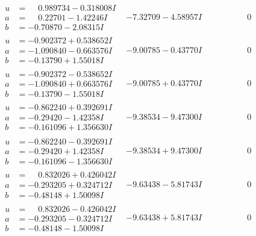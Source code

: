 \documentclass[1p]{elsarticle_modified}
\theoremstyle{definition}
\begin{document}
$$\begin{array}{c|c|c}
\begin{aligned}
u &= \phantom{-}0.989734 - 0.318008 I \\
a &= \phantom{-}0.22701 - 1.42246 I \\
b &= -0.70870 - 2.08315 I\end{aligned}
 & -7.32709 - 4.58957 I & \phantom{-0.000000 } 0 \\ \hline\begin{aligned}
u &= -0.902372 + 0.538652 I \\
a &= -1.090840 - 0.663576 I \\
b &= -0.13790 + 1.55018 I\end{aligned}
 & -9.00785 - 0.43770 I & \phantom{-0.000000 } 0 \\ \hline\begin{aligned}
u &= -0.902372 - 0.538652 I \\
a &= -1.090840 + 0.663576 I \\
b &= -0.13790 - 1.55018 I\end{aligned}
 & -9.00785 + 0.43770 I & \phantom{-0.000000 } 0 \\ \hline\begin{aligned}
u &= -0.862240 + 0.392691 I \\
a &= -0.29420 - 1.42358 I \\
b &= -0.161096 + 1.356630 I\end{aligned}
 & -9.38534 - 9.47300 I & \phantom{-0.000000 } 0 \\ \hline\begin{aligned}
u &= -0.862240 - 0.392691 I \\
a &= -0.29420 + 1.42358 I \\
b &= -0.161096 - 1.356630 I\end{aligned}
 & -9.38534 + 9.47300 I & \phantom{-0.000000 } 0 \\ \hline\begin{aligned}
u &= \phantom{-}0.832026 + 0.426042 I \\
a &= -0.293205 + 0.324712 I \\
b &= -0.48148 + 1.50098 I\end{aligned}
 & -9.63438 - 5.81743 I & \phantom{-0.000000 } 0 \\ \hline\begin{aligned}
u &= \phantom{-}0.832026 - 0.426042 I \\
a &= -0.293205 - 0.324712 I \\
b &= -0.48148 - 1.50098 I\end{aligned}
 & -9.63438 + 5.81743 I & \phantom{-0.000000 } 0 \\ \hline\begin{aligned}

\end{aligned}
\end{array}$$
\end{document}
